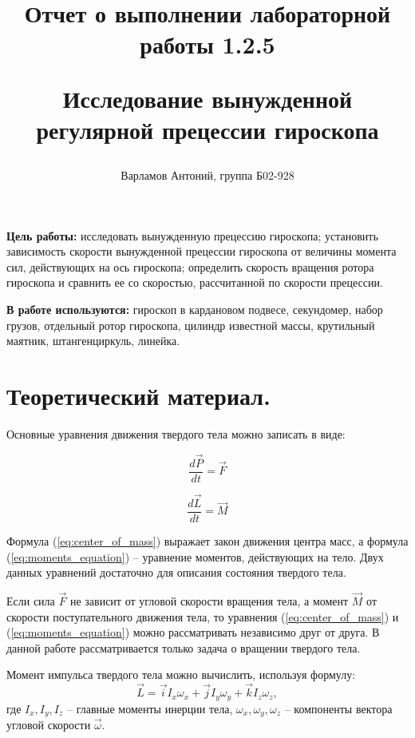 \documentclass[12pt,a4paper]{article}
\title{
Отчет о выполнении лабораторной работы 1.2.5

Исследование вынужденной регулярной прецессии гироскопа
}
\author{Варламов Антоний, группа Б02-928}
\begin{document}
\maketitle

\newpage

	\textbf{Цель работы:} исследовать вынужденную прецессию гироскопа; установить зависимость скорости вынужденной прецессии гироскопа от величины момента сил, действующих на ось гироскопа; определить скорость вращения ротора гироскопа и сравнить ее со скоростью, рассчитанной по скорости прецессии.
	
	\textbf{В работе используются:} гироскоп в кардановом подвесе, секундомер, набор грузов, отдельный ротор гироскопа, цилиндр известной массы, крутильный маятник, штангенциркуль, линейка. 


\section{Теоретический материал.}

Основные уравнения движения твердого тела можно записать в виде:

\begin{equation}
	\frac{d\vec{P}}{dt} = \vec{F}
	\label{eq:center_of_mass}
\end{equation}

\begin{equation}
	\frac{d\vec{L}}{dt} = \vec{M}
	\label{eq:moments_equation}
\end{equation}

Формула (\ref{eq:center_of_mass}) выражает закон движения центра масс, а формула (\ref{eq:moments_equation}) -- уравнение моментов, действующих на тело. Двух данных уравнений достаточно для описания состояния твердого тела.

Если сила $\vec{F}$ не зависит от угловой скорости вращения тела, а момент $\vec{M}$ от скорости поступательного движения тела, то уравнения (\ref{eq:center_of_mass}) и (\ref{eq:moments_equation}) можно рассматривать независимо друг от друга. В данной работе рассматривается только задача о вращении твердого тела.

Момент импульса твердого тела можно вычислить, используя формулу:
\begin{equation}
	\vec{L} = \vec{i}I_{x}\omega_{x} + \vec{j}I_{y}\omega_{y} + \vec{k}I_{z}\omega_{z},
\end{equation}
где $ I_{x},I_{y},I_{z} $ -- главные моменты инерции тела, $ \omega_{x}, \omega_{y}, \omega_{z} $ -- компоненты вектора угловой скорости  $\vec{\omega} $.
\end{document}
